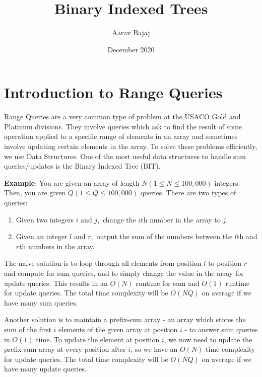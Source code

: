 \documentclass{article}
\title{Binary Indexed Trees}
\author{Aarav Bajaj}
\date{December 2020}
\begin{document}
\maketitle

\section{Introduction to Range Queries}
    Range Queries are a very common type of problem at the USACO Gold and Platinum divisions. They involve queries which ask to find the result of some operation applied to a specific range of elements in an array and sometimes involve updating certain elements in the array. To solve these problems efficiently, we use Data Structures. One of the most useful data structures to handle sum queries/updates is the Binary Indexed Tree (BIT).
    
    \vspace{5pt}\noindent\textbf{Example}: \vspace{5pt}\newline\noindent You are given an array of length $N (1 \leq N \leq 100,000)$ integers. Then, you are given $Q (1 \leq Q \leq 100,000)$ queries. There are two types of queries:
    \begin{enumerate}
        \item Given two integers $i$ and $j,$ change the $i$th number in the array to $j.$
        \item Given an integer $l$ and $r,$ output the sum of the numbers between the $l$th and $r$th numbers in the array.
    \end{enumerate}
    
    \noindent The naive solution is to loop through all elements from position $l$ to position $r$ and compute for sum queries, and to simply change the value in the array for update queries. This results in an $O(N)$ runtime for sum and $O(1)$ runtime for update queries. The total time complexity will be $O(NQ)$ on average if we have many sum queries.
    
    \vspace{5pt}\noindent Another solution is to maintain a prefix-sum array - an array which stores the sum of the first $i$ elements of the given array at position $i$ - to answer sum queries in $O(1)$ time. To update the element at position $i$, we now need to update the prefix-sum array at every position after $i$, so we have an $O(N)$ time complexity for update queries. The total time complexity will be $O(NQ)$ on average if we have many update queries.
    
\end{document}
